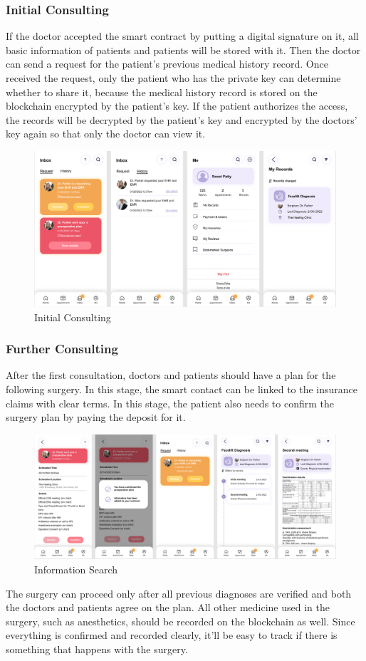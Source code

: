 \documentclass{article}
\begin{document}
\subsubsection{Initial Consulting}
If the doctor accepted the smart contract by putting a digital signature on it, all basic information of patients and patients will be stored with it. Then the doctor can send a request for the patient's previous medical history record. Once received the request, only the patient who has the private key can determine whether to share it, because the medical history record is stored on the blockchain encrypted by the patient's key. If the patient authorizes the access, the records will be decrypted by the patient's key and encrypted by the doctors' key again so that only the doctor can view it.
\begin{figure}[H]
    \centering
    \includegraphics[scale=0.5]{InitialConsulting.jpg}
    \caption{Initial Consulting}
\end{figure}
\subsubsection{Further Consulting}
After the first consultation, doctors and patients should have a plan for the following surgery. In this stage, the smart contact can be linked to the insurance claims with clear terms. In this stage, the patient also needs to confirm the surgery plan by paying the deposit for it.
\begin{figure}[H]
    \centering
    \includegraphics[scale=0.5]{SecondConsulting.jpg}
    \caption{Information Search}
\end{figure}
The surgery can proceed only after all previous diagnoses are verified and both the doctors and patients agree on the plan. All other medicine used in the surgery, such as anesthetics, should be recorded on the blockchain as well. Since everything is confirmed and recorded clearly, it'll be easy to track if there is something that happens with the surgery. 
\end{document}
